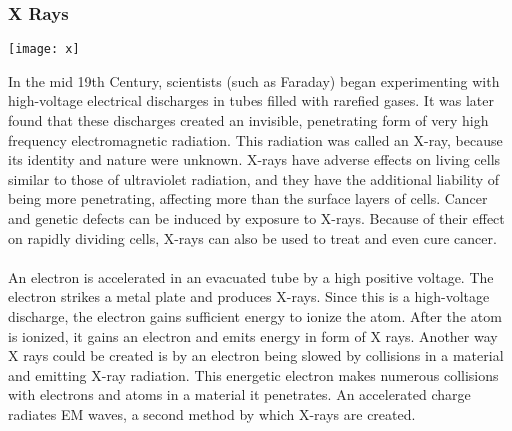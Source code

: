 \documentclass[11pt]{article}
\begin{document}
	\subsubsection*{X Rays}
	\begin{center}
		\texttt{[image: x]}
	\end{center}
	In the mid 19th Century, scientists (such as Faraday) began experimenting with high-voltage electrical discharges in tubes filled with rarefied gases. It was later found that these discharges created an invisible, penetrating form of very high frequency electromagnetic radiation. This radiation was called an X-ray, because its identity and nature were unknown. X-rays have adverse effects on living cells similar to those of ultraviolet radiation, and they have the additional liability of being more penetrating, affecting more than the surface layers of cells. Cancer and genetic defects can be induced by exposure to X-rays. Because of their effect on rapidly dividing cells, X-rays can also be used to treat and even cure cancer. \\ \\
	An electron is accelerated in an evacuated tube by a high positive voltage. The electron strikes a metal plate and produces X-rays. Since this is a high-voltage discharge, the electron gains sufficient energy to ionize the atom. After the atom is ionized, it gains an electron and emits energy in form of X rays. Another way X rays could be created is by an electron being slowed by collisions in a material and emitting X-ray radiation. This energetic electron makes numerous collisions with electrons and atoms in a material it penetrates. An accelerated charge radiates EM waves, a second method by which X-rays are created.
\end{document}
